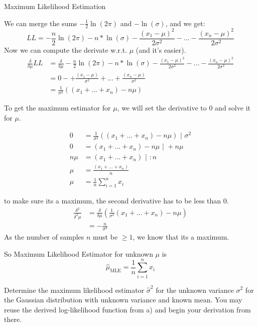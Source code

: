 \documentclass[
	english,
        solution=true
	]{tudaexercise}
\begin{document}
\begin{task}[points=20]{Maximum Likelihood Estimation}
\begin{subtask}[points=7]
\begin{solution}
We can merge the sums $-\frac{1}{2} \ln(2\pi)$ and $-\ln(\sigma)$, and we get:
\[LL=-\frac{n}{2} \ln(2\pi) - n * \ln(\sigma) - \frac{(x_1-\mu)^2}{2\sigma^2}-...- \frac{(x_n-\mu)^2}{2\sigma^2}\]
Now we can compute the derivate w.r.t. $\mu$ (and it's easier).
\begin{align*}
    \frac{\delta}{ \delta \mu} LL &= \frac{\delta}{\delta \mu} -\frac{n}{2} \ln(2\pi) - n * \ln(\sigma) - \frac{(x_1-\mu)^2}{2\sigma^2}-...- \frac{(x_n-\mu)^2}{2\sigma^2} \\
    &= 0 - + \frac{(x_1-\mu)}{\sigma^2}+...+\frac{(x_n-\mu)}{\sigma^2} \\
    &= \frac{1}{\sigma^2}((x_1+...+x_n)-n\mu)
\end{align*}

To get the maximum estimator for $\mu$, we will set the derivative to $0$ and solve it for $\mu$.

\begin{align*}
    0 &= \frac{1}{\sigma^2}((x_1+...+x_n)-n\mu) \text{  | } \sigma^2\\
    0 &= (x_1+...+x_n)-n\mu \text{  | } +n\mu \\
    n\mu &= (x_1+...+x_n) \text{  | } :n \\
    \mu &= \frac{(x_1+...+x_n)}{n} \\
    \mu &= \frac{1}{n} \sum^n_{i=1} x_i
\end{align*}

to make sure its a maximum, the second derivative has to be less than 0.
\begin{align*}
    \frac{\delta^2}{\delta^2 \mu} &= \frac{\delta}{\delta \mu}(\frac{1}{\sigma^2}(x_1+...+x_n)-n\mu) \\ 
    &= -\frac{n}{\sigma^2}
\end{align*}
As the number of samples $n$ must be $\geq 1$, we know that its a maximum.

So Maximum Likelihood Estimator for unknown $\mu$ is
\[\hat{\mu}_{\text{MLE}}= \frac{1}{n} \sum^n_{i=1} x_i\]

\end{solution}
\end{subtask}


\begin{subtask}[points=5]

Determine the maximum likelihood estimator $\hat{\sigma}^{2}$ for the unknown variance \( \sigma^2 \) for the Gaussian distribution with unknown variance and known mean. You may reuse the derived log-likelihood function from a) and begin your derivation from there. 


\end{subtask}
\end{task}
\end{document}
